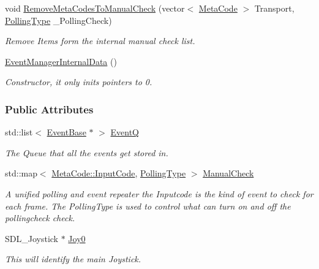 \begin{DoxyCompactItemize}
void \hyperlink{structphys_1_1internal_1_1EventManagerInternalData_a54babcae1822814f09beace684f97e72}{RemoveMetaCodesToManualCheck} (vector$<$ \hyperlink{classphys_1_1MetaCode}{MetaCode} $>$ Transport, \hyperlink{structphys_1_1internal_1_1EventManagerInternalData_ab9ab8380b84448aacf46a63050e159af}{PollingType} \_\-PollingCheck)
\begin{DoxyCompactList}\small\item\em Remove Items form the internal manual check list. \item\end{DoxyCompactList}\item 
\hyperlink{structphys_1_1internal_1_1EventManagerInternalData_a2bc6e8af4992cc8b4935f4e5b32b32a0}{EventManagerInternalData} ()
\begin{DoxyCompactList}\small\item\em Constructor, it only inits pointers to 0. \item\end{DoxyCompactList}\end{DoxyCompactItemize}
\subsubsection*{Public Attributes}
\begin{DoxyCompactItemize}
\item 
std::list$<$ \hyperlink{classphys_1_1EventBase}{EventBase} $\ast$ $>$ \hyperlink{structphys_1_1internal_1_1EventManagerInternalData_a2a3389f3831cae8ded6dd0a3b6395a68}{EventQ}
\begin{DoxyCompactList}\small\item\em The Queue that all the events get stored in. \item\end{DoxyCompactList}\item 
std::map$<$ \hyperlink{classphys_1_1MetaCode_a3e501cbb5bf0f6f1fdb7211465bda8d8}{MetaCode::InputCode}, \hyperlink{structphys_1_1internal_1_1EventManagerInternalData_ab9ab8380b84448aacf46a63050e159af}{PollingType} $>$ \hyperlink{structphys_1_1internal_1_1EventManagerInternalData_a717396b1782d7f491e0f085643507639}{ManualCheck}
\begin{DoxyCompactList}\small\item\em A unified polling and event repeater the Inputcode is the kind of event to check for each frame. The PollingType is used to control what can turn on and off the pollingcheck check. \item\end{DoxyCompactList}\item 
SDL\_\-Joystick $\ast$ \hyperlink{structphys_1_1internal_1_1EventManagerInternalData_aafd32b9b23cb2121bd268e3c56a3f46e}{Joy0}
\begin{DoxyCompactList}\small\item\em This will identify the main Joystick. \item\end{DoxyCompactList}\end{DoxyCompactItemize}



